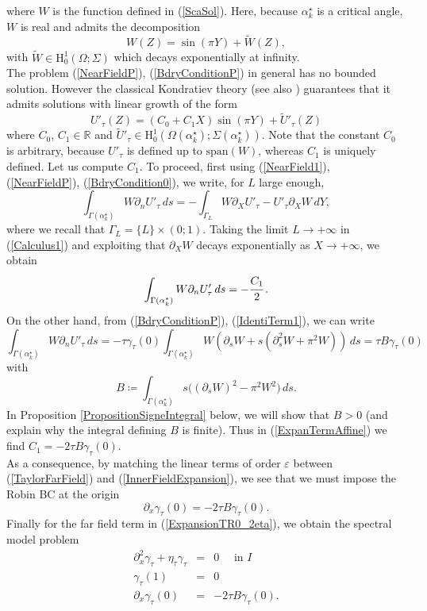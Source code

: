\documentclass[11pt,a4paper]{article}
\newcommand{\eps}{\varepsilon}
\newcommand{\Om}{\Omega}
\newcommand{\mrm}[1]{\mathrm{#1}}
\newcommand{\R}{\mathbb{R}}
\newcommand{\mH}{\mrm{H}}
\begin{document}
where $W$ is the function defined in (\ref{ScaSol}). Here, because $\alpha^\star_k$ is a critical angle, $W$ is real and admits the decomposition 
\[
W(Z)=\sin(\pi Y)+\widetilde{W}(Z),
\]
with $\widetilde{W}\in\mH^1_0(\Om;\Sigma)$ which decays exponentially at infinity.\\
\newline
The problem (\ref{NearFieldP}), (\ref{BdryConditionP}) in general has no bounded solution. However the classical Kondratiev theory \cite{Kond67} (see also \cite[Chap.\,2 and 5]{NaPl94}) guarantees that it admits solutions with linear growth of the form
\begin{equation}\label{ExpanTermAffine}
U'_{\tau}(Z)=(C_0+C_1X)\sin(\pi Y)+\tilde{U}'_{\tau}(Z)
\end{equation}
where $C_0$, $C_1\in\R$ and $\tilde{U}'_{\tau}\in\mH^1_0(\Om(\alpha_k^\star);\Sigma(\alpha_k^\star))$. Note that the constant $C_0$ is arbitrary, because $U'_{\tau}$ is defined up to $\mrm{span}(W)$, whereas $C_1$ is uniquely defined. Let us compute $C_1$. To proceed, first using (\ref{NearField1}), (\ref{NearFieldP}), (\ref{BdryCondition0}), we write, for $L$ large enough,
\begin{equation}\label{Calculus1}
\int_{\Gamma(\alpha^\star_k)} W\partial_n U'_{\tau}\,ds=-\int_{\Gamma_L} W\partial_X U'_{\tau}-U'_{\tau}\partial_X W\,dY,
\end{equation}
where we recall that $\Gamma_L=\{L\}\times(0;1)$. Taking the limit $L\to+\infty$ in (\ref{Calculus1}) and exploiting that $\partial_X W$ decays exponentially as $X\to+\infty$, we obtain 
\[
\int_{\Gamma(\alpha^\star_k)} W\partial_n U'_{\tau}\,ds=-\cfrac{C_1}{2}\,.
\]
On the other hand, from (\ref{BdryConditionP}), (\ref{IdentiTerm1}), we can write
\[
\int_{\Gamma(\alpha^\star_k)} W\partial_n U'_{\tau}\,ds=-\tau\gamma_\tau(0)\int_{\Gamma(\alpha^\star_k)} W(\partial_sW+ s(\partial^2_sW+\pi^2W))\,ds = \tau B\gamma_\tau(0)
\]
with 
\begin{equation}\label{CalculusB}
B\coloneqq\int_{\Gamma(\alpha^\star_k)}s\big((\partial_sW)^2-\pi^2W^2\big)\,ds.
\end{equation}
In Proposition \ref{PropositionSigneIntegral} below, we will show that $B>0$ (and explain why the integral defining $B$ is finite). Thus in (\ref{ExpanTermAffine}) we find $C_1=-2\tau B \gamma_\tau(0)$.\\
As a consequence, by matching the linear terms of order $\eps$ between (\ref{TaylorFarField}) and (\ref{InnerFieldExpansion}), we see that we must impose the Robin BC at the origin
\[
\partial_x\gamma_\tau(0)=-2\tau B\gamma_\tau(0).
\]
Finally for the far field term in (\ref{ExpansionTR0_2eta}), we obtain the spectral model problem 
\begin{equation}\label{farfieldetaeta2}
\begin{array}{|rcl}
\partial^2_x\gamma_\tau+\eta_\tau\gamma_\tau&=&0\quad\mbox{ in }I\\[3pt]
\gamma_\tau(1)&=&0\\[3pt]
\partial_x\gamma_\tau(0)&=&-2\tau B\gamma_\tau(0).
\end{array}
\end{equation}
\end{document}
